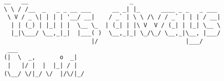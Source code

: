 \documentclass[a4paper,english]{article}
\begin{document}
\pagebreak
\begin{verbatim}















      __   __                             _
      \ \ / /__  _   _ _ __ ___      __ _| |_      ____ _ _   _ ___
       \ V / _ \| | | | '__/ __|    / _` | \ \ /\ / / _` | | | / __|
        | | (_) | |_| | |  \__ \_  | (_| | |\ V  V / (_| | |_| \__ \
        |_|\___/ \__,_|_|  |___( )  \__,_|_| \_/\_/ \__,_|\__, |___/
                               |/                         |___/
       ___
      (|  \  _,       o  _|
       |   |/ |  |  |_| / |
      (\__/ \/|_/ \/  |/\/|_/

\end{verbatim}
\end{document}
